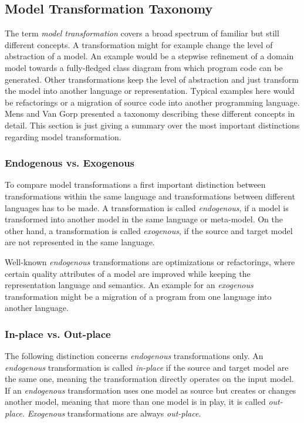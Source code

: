 \documentclass[runningheads]{llncs}
\begin{document}
\subsection{Model Transformation Taxonomy}\label{transformation-taxonomy}
The term \textit{model transformation} covers a broad spectrum of familiar but still different concepts. A transformation might for example change the level of abstraction of a model. An example would be a stepwise refinement of a domain model towards a fully-fledged class diagram from which program code can be generated. Other transformations keep the level of abstraction and just transform the model into another language or representation. Typical examples here would be refactorings or a migration of source code into another programming language. Mens and Van Gorp \cite{MENS2006125} presented a taxonomy describing these different concepts in detail. This section is just giving a summary over the most important distinctions regarding model transformation.

\subsubsection{Endogenous vs. Exogenous}
To compare model transformations a first important distinction between transformations within the same language and transformations between different languages has to be made. A transformation is called \textit{endogenous}, if a model is transformed into another model in the same language or meta-model. On the other hand, a transformation is called \textit{exogenous}, if the source and target model are not represented in the same language.

Well-known \textit{endogenous} transformations are optimizations or refactorings, where certain quality attributes of a model are improved while keeping the representation language and semantics. An example for an \textit{exogenous} transformation might be a migration of a program from one language into another language.

\subsubsection{In-place vs. Out-place}
The following distinction concerns \textit{endogenous} transformations only. An \textit{endogenous} transformation is called \textit{in-place} if the source and target model are the same one, meaning the transformation directly operates on the input model. If an \textit{endogenous} transformation uses one model as source but creates or changes another model, meaning that more than one model is in play, it is called \textit{out-place}. \textit{Exogenous} transformations are always \textit{out-place}.
\end{document}
